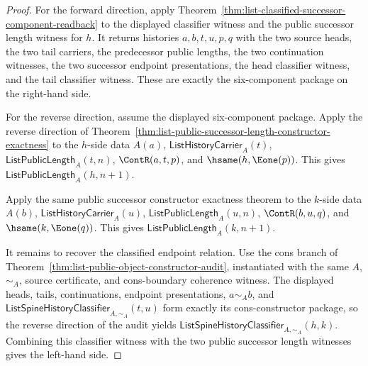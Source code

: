\begin{proof}
For the forward direction, apply
Theorem~\ref{thm:list-classified-successor-component-readback} to the
displayed classifier witness and the public successor length witness for $h$.
It returns histories $a,b,t,u,p,q$ with the two source heads, the two tail
carriers, the predecessor public lengths, the two continuation witnesses, the
two successor endpoint presentations, the head classifier witness, and the
tail classifier witness. These are exactly the six-component package on the
right-hand side.

For the reverse direction, assume the displayed six-component package. Apply
the reverse direction of
Theorem~\ref{thm:list-public-successor-length-constructor-exactness} to the
$h$-side data $A(a)$, $\mathsf{ListHistoryCarrier}_A(t)$,
$\mathsf{ListPublicLength}_A(t,n)$, $\ContR(a,t,p)$, and
$\hsame(h,\Eone(p))$. This gives
$\mathsf{ListPublicLength}_A(h,n+1)$.

Apply the same public successor constructor exactness theorem to the $k$-side
data $A(b)$, $\mathsf{ListHistoryCarrier}_A(u)$,
$\mathsf{ListPublicLength}_A(u,n)$, $\ContR(b,u,q)$, and
$\hsame(k,\Eone(q))$. This gives
$\mathsf{ListPublicLength}_A(k,n+1)$.

It remains to recover the classified endpoint relation. Use the cons branch of
Theorem~\ref{thm:list-public-object-constructor-audit}, instantiated with the
same $A$, $\sim_A$, source certificate, and cons-boundary coherence witness.
The displayed heads, tails, continuations, endpoint presentations,
$a\sim_A b$, and
$\mathsf{ListSpineHistoryClassifier}_{A,\sim_A}(t,u)$ form exactly its
cons-constructor package, so the reverse direction of the audit yields
$\mathsf{ListSpineHistoryClassifier}_{A,\sim_A}(h,k)$. Combining this
classifier witness with the two public successor length witnesses gives the
left-hand side.
\end{proof}

